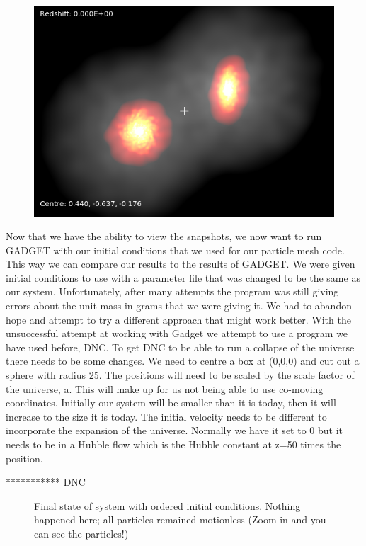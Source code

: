 \documentclass[10pt]{article}
\begin{document}
\begin{figure}[h]
\includegraphics[width=4.5in]{gadget.png}
\centering
\end{figure}


	Now that we have the ability to view the snapshots, we now want to run GADGET with our initial conditions that we used for our particle mesh code. This way we can compare our results to the results of GADGET. We were given initial conditions to use with a parameter file that was changed to be the same as our system. Unfortunately, after many attempts the program was still giving errors about the unit mass in grams that we were giving it. We had to abandon hope and attempt to try a different approach that might work better. With the unsuccessful attempt at working with Gadget we attempt to use a program we have used before, DNC. 
	To get DNC to be able to run a collapse of the universe there needs to be some changes. We need to centre a box at (0,0,0) and cut out a sphere with radius 25.  The positions will need to be scaled by the scale factor of the universe, a. This will make up for us not being able to use co-moving coordinates. Initially our system will be smaller than it is today, then it will increase to the size it is today. The initial velocity needs to be different to incorporate the expansion of the universe. Normally we have it set to 0 but it needs to be in a Hubble flow which is the Hubble constant at z=50 times the position.

*********** DNC




\begin{figure}[htbp]
\centering

\caption{Final state of system with ordered initial conditions. Nothing happened here; all particles remained motionless (Zoom in and you can see the particles!)}
\label{fig:order}
\end{figure}
\end{document}
